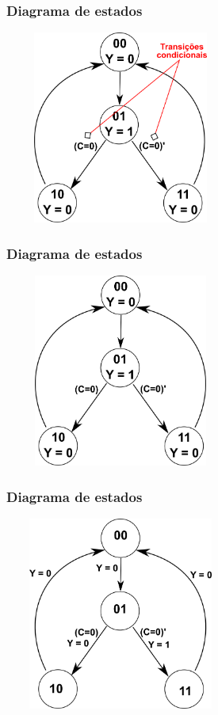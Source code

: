 \documentclass{beamer}
\begin{document}
\begin{frame}
  \frametitle{Diagrama de estados}
    \includegraphics[height = 2.5in, width = 3in]{mealyvsmoore_3.png}
\end{frame}

\begin{frame}
  \frametitle{Diagrama de estados}
    \includegraphics[height = 2.5in, width = 3in]{mealyvsmoore_4.png}
\end{frame}

\begin{frame}
  \frametitle{Diagrama de estados}
    \includegraphics[height = 2.5in, width = 3in]{mealyvsmoore_5.png}
\end{frame}
\end{document}
